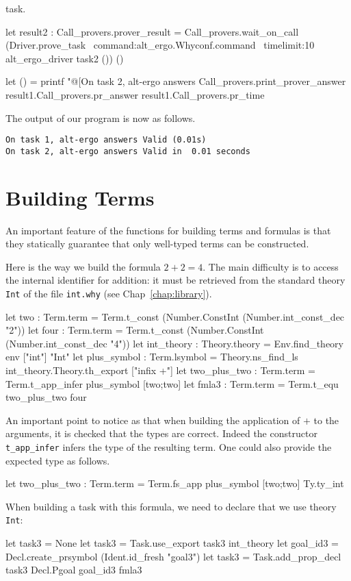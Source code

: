 task.
\begin{ocamlcode}
let result2 : Call_provers.prover_result =
   Call_provers.wait_on_call
    (Driver.prove_task ~command:alt_ergo.Whyconf.command
    ~timelimit:10
    alt_ergo_driver task2 ()) ()

let () =
  printf "@[On task 2, alt-ergo answers %
    Call_provers.print_prover_answer
    result1.Call_provers.pr_answer
    result1.Call_provers.pr_time
\end{ocamlcode}
The output of our program is now as follows.
\begin{verbatim}
On task 1, alt-ergo answers Valid (0.01s)
On task 2, alt-ergo answers Valid in  0.01 seconds
\end{verbatim}

\section{Building Terms}

An important feature of the functions for building terms and formulas
is that they statically guarantee that only well-typed terms can be
constructed.

Here is the way we build the formula $2+2=4$. The main difficulty is to
access the internal identifier for addition: it must be retrieved from
the standard theory \texttt{Int} of the file \texttt{int.why} (see
Chap~\ref{chap:library}).
\begin{ocamlcode}
let two : Term.term = 
  Term.t_const (Number.ConstInt (Number.int_const_dec "2"))
let four : Term.term = 
  Term.t_const (Number.ConstInt (Number.int_const_dec "4"))
let int_theory : Theory.theory =
  Env.find_theory env ["int"] "Int"
let plus_symbol : Term.lsymbol =
  Theory.ns_find_ls int_theory.Theory.th_export ["infix +"]
let two_plus_two : Term.term =
  Term.t_app_infer plus_symbol [two;two]
let fmla3 : Term.term = Term.t_equ two_plus_two four
\end{ocamlcode}
An important point to notice as that when building the application of
$+$ to the arguments, it is checked that the types are correct. Indeed
the constructor \texttt{t\_app\_infer} infers the type of the resulting
term. One could also provide the expected type as follows.
\begin{ocamlcode}
let two_plus_two : Term.term =
  Term.fs_app plus_symbol [two;two] Ty.ty_int
\end{ocamlcode}

When building a task with this formula, we need to declare that we use
theory \texttt{Int}:
\begin{ocamlcode}
let task3 = None
let task3 = Task.use_export task3 int_theory
let goal_id3 = Decl.create_prsymbol (Ident.id_fresh "goal3")
let task3 = Task.add_prop_decl task3 Decl.Pgoal goal_id3 fmla3
\end{ocamlcode}

